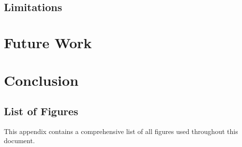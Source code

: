 \documentclass[12pt, a4paper, ukenglish]{article}
\begin{document}
    
    \subsection{Limitations} \label{sec: limitations}

\section{Future Work} \label{sec: future work}

    
\section{Conclusion} \label{sec: conclusion}



\newpage
{}
\printbibliography



\clearpage
\newpage
\begin{appendices}
     
     \section{List of Figures}
     This appendix contains a comprehensive list of all figures used throughout this document.
     
     \listoffigures
     
     
     \clearpage



\end{appendices}
\end{document}
